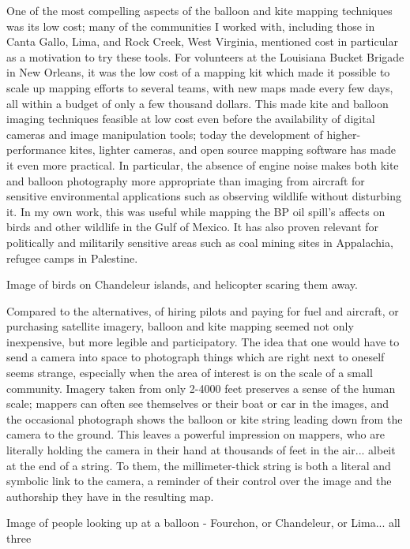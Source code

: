 \documentclass[11pt]{report}
\begin{document}
One of the most compelling aspects of the balloon and kite mapping techniques was its low cost; many of the communities I worked with, including those in Canta Gallo, Lima, and Rock Creek, West Virginia, mentioned cost in particular as a motivation to try these tools. For volunteers at the Louisiana Bucket Brigade in New Orleans, it was the low cost of a mapping kit which made it possible to scale up mapping efforts to several teams, with new maps made every few days, all within a budget of only a few thousand dollars. This made kite and balloon imaging techniques feasible at low cost even before the availability of digital cameras and image manipulation tools; today the development of higher-performance kites, lighter cameras, and open source mapping software has made it even more practical. In particular, the absence of engine noise makes both kite and balloon photography more appropriate than imaging from aircraft for sensitive environmental applications such as observing wildlife without disturbing it. \cite{aber1999kite} In my own work, this was useful while mapping the BP oil spill's affects on birds and other wildlife in the Gulf of Mexico. It has also proven relevant for politically and militarily sensitive areas such as coal mining sites in Appalachia, refugee camps in Palestine.

Image of birds on Chandeleur islands, and helicopter scaring them away.  

Compared to the alternatives, of hiring pilots and paying for fuel and aircraft, or purchasing satellite imagery, balloon and kite mapping seemed not only inexpensive, but more legible and participatory. The idea that one would have to send a camera into space to photograph things which are right next to oneself seems strange, especially when the area of interest is on the scale of a small community. Imagery taken from only 2-4000 feet preserves a sense of the human scale; mappers can often see themselves or their boat or car in the images, and the occasional photograph shows the balloon or kite string leading down from the camera to the ground. This leaves a powerful impression on mappers, who are literally holding the camera in their hand at thousands of feet in the air... albeit at the end of a string. To them, the millimeter-thick string is both a literal and symbolic link to the camera, a reminder of their control over the image and the authorship they have in the resulting map.  

Image of people looking up at a balloon - Fourchon, or Chandeleur, or Lima... all three
\end{document}
